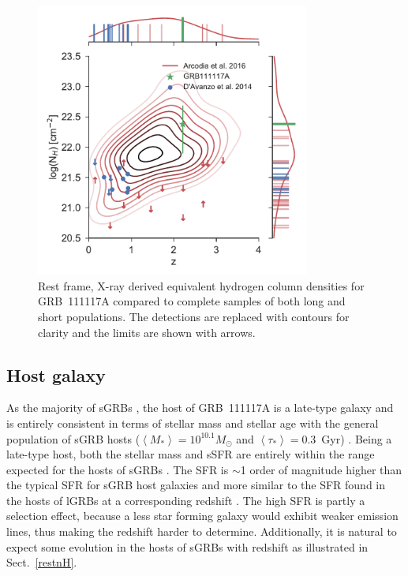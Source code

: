 \documentclass{aa}    %
\begin{document}
\begin{figure}
	\centering
	\includegraphics[width=9cm]{figures/NH_z.pdf}
	\caption{Rest frame, X-ray derived equivalent hydrogen column densities for GRB~111117A compared to complete samples of both long and short populations. The detections are replaced with contours for clarity and the limits are shown with arrows.}
	\label{fig:NH_z}
\end{figure}


\subsection{Host galaxy}

As the majority of sGRBs \citep{Fong2013b}, the host of GRB~111117A is a
late-type galaxy and is entirely consistent in terms of stellar mass and stellar
age with the general population of sGRB hosts ($\left\langle M _*
\right\rangle = 10^{10.1} M_{\odot}$ and $\left\langle \tau _* \right\rangle =
0.3 $~Gyr) \citep{Leibler2010}. Being a late-type host, both the stellar mass
and sSFR are entirely within the range expected for the hosts of sGRBs
\citep{Behroozi2014}. The SFR is $\sim$1 order of magnitude higher than the
typical SFR for sGRB host galaxies \citep{Berger2014} and more similar to
the SFR found in the hosts of lGRBs at a corresponding redshift
\citep{Kruhler2015}. The high SFR is partly a selection effect, because a less
star forming galaxy would exhibit weaker emission lines, thus making the
redshift harder to determine. Additionally, it is natural to expect some
evolution in the hosts of sGRBs with redshift as illustrated in Sect.~\ref{restnH}. 
\end{document}

